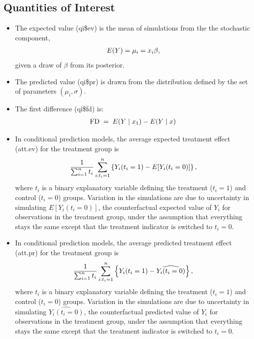 \documentclass[letterpaper,10pt,english]{sphinxmanual}
\begin{document}
\subsection{Quantities of Interest}
\label{vignette:id37}\begin{itemize}
\item {} 
The expected value (qi\$ev) is the mean of simulations from the the
stochastic component,
\begin{gather}
\begin{split}E(Y) = \mu_i = x_i \beta,\end{split}\notag
\end{gather}
given a draw of \(\beta\) from its posterior.

\item {} 
The predicted value (qi\$pr) is drawn from the distribution defined by
the set of parameters \((\mu_i, \sigma)\).

\item {} 
The first difference (qi\$fd) is:
\begin{gather}
\begin{split}\textrm{FD}\; = \;E(Y \mid x_1) -  E(Y \mid x)\end{split}\notag
\end{gather}
\item {} 
In conditional prediction models, the average expected treatment
effect (att.ev) for the treatment group is
\begin{gather}
\begin{split}\frac{1}{\sum_{i=1}^n t_i}\sum_{i:t_i=1}^n \left\{ Y_i(t_i=1) -
      E[Y_i(t_i=0)] \right\},\end{split}\notag
\end{gather}
where \(t_i\) is a binary explanatory variable defining the
treatment (\(t_i=1\)) and control (\(t_i=0\)) groups.
Variation in the simulations are due to uncertainty in simulating
\(E[Y_i(t_i=0)]\), the counterfactual expected value of
\(Y_i\) for observations in the treatment group, under the
assumption that everything stays the same except that the treatment
indicator is switched to \(t_i=0\).

\item {} 
In conditional prediction models, the average predicted treatment
effect (att.pr) for the treatment group is
\begin{gather}
\begin{split}\frac{1}{\sum_{i=1}^n t_i}\sum_{i:t_i=1}^n \left\{ Y_i(t_i=1) -
      \widehat{Y_i(t_i=0)} \right\},\end{split}\notag
\end{gather}
where \(t_i\) is a binary explanatory variable defining the
treatment (\(t_i=1\)) and control (\(t_i=0\)) groups.
Variation in the simulations are due to uncertainty in simulating
\(\widehat{Y_i(t_i=0)}\), the counterfactual predicted value of
\(Y_i\) for observations in the treatment group, under the
assumption that everything stays the same except that the treatment
indicator is switched to \(t_i=0\).

\end{itemize}
\end{document}
